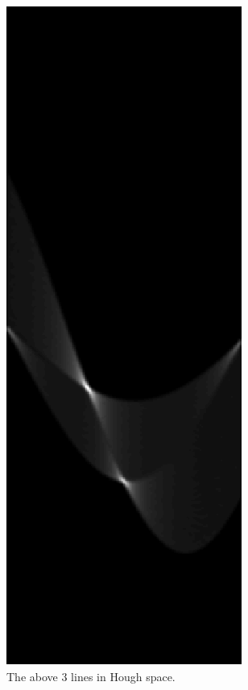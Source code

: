     \begin{figure}[H]
      \centering
      \includegraphics[scale=0.8]{./images/Q8/triangle128/2.png}
      \caption{The above $3$ lines in Hough space.}
      \label{fig:Q8_triangle128_2}
    \end{figure}

